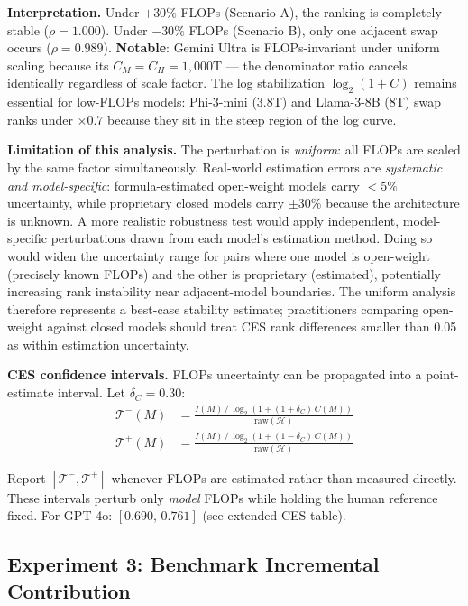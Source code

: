 \documentclass[12pt]{article}
\begin{document}
\textbf{Interpretation.} Under $+30\%$ FLOPs (Scenario A), the ranking is completely stable ($\rho = 1.000$). Under $-30\%$ FLOPs (Scenario B), only one adjacent swap occurs ($\rho = 0.989$). \textbf{Notable}: Gemini Ultra is FLOPs-invariant under uniform scaling because its $C_M = C_H = 1{,}000$T --- the denominator ratio cancels identically regardless of scale factor. The log stabilization $\log_2(1+C)$ remains essential for low-FLOPs models: Phi-3-mini (3.8T) and Llama-3-8B (8T) swap ranks under $\times0.7$ because they sit in the steep region of the log curve.

\noindent\textbf{Limitation of this analysis.} The perturbation is \textit{uniform}: all FLOPs are scaled by the same factor simultaneously. Real-world estimation errors are \textit{systematic and model-specific}: formula-estimated open-weight models carry $<5\%$ uncertainty, while proprietary closed models carry $\pm30\%$ because the architecture is unknown. A more realistic robustness test would apply independent, model-specific perturbations drawn from each model's estimation method. Doing so would widen the uncertainty range for pairs where one model is open-weight (precisely known FLOPs) and the other is proprietary (estimated), potentially increasing rank instability near adjacent-model boundaries. The uniform analysis therefore represents a best-case stability estimate; practitioners comparing open-weight against closed models should treat CES rank differences smaller than 0.05 as within estimation uncertainty.

\noindent\textbf{CES confidence intervals.} FLOPs uncertainty can be propagated into a point-estimate interval. Let $\delta_C = 0.30$:
\begin{align}
\mathcal{T}^{-}(M) &= \frac{I(M)\,/\,\log_2(1+(1+\delta_C)\,C(M))}{\mathrm{raw}(\mathcal{H})} \\
\mathcal{T}^{+}(M) &= \frac{I(M)\,/\,\log_2(1+(1-\delta_C)\,C(M))}{\mathrm{raw}(\mathcal{H})}
\end{align}
{\sloppy Report $[\mathcal{T}^-, \mathcal{T}^+]$ whenever FLOPs are estimated rather than measured directly. These intervals perturb only \textit{model} FLOPs while holding the human reference fixed. For GPT-4o: $[0.690,\,0.761]$ (see extended CES table).\par}

\subsection{Experiment 3: Benchmark Incremental Contribution}
\label{sec:exp3}
\end{document}
